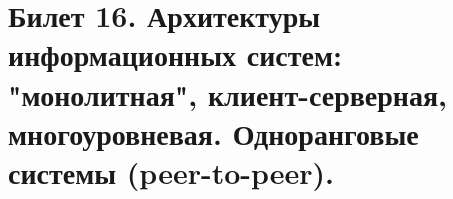 \newpage
\section {Билет 16. Архитектуры информационных систем: "монолитная", клиент-серверная, многоуровневая. Одноранговые системы (peer-to-peer).}